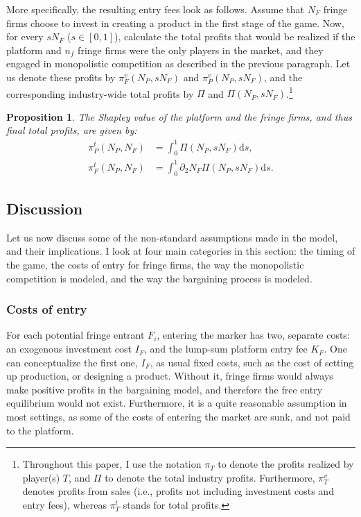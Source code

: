 \documentclass[a4paper]{article}
\newtheorem{proposition}{Proposition}
\newcommand{\ds}{\mathrm{d}s}
\begin{document}
More specifically, the resulting entry fees look as follows.
Assume that $N_F$ fringe firms choose to invest in creating a product in the first stage of the game.
Now, for every $s N_F$ ($s \in [0, 1]$), calculate the total profits that would be realized if the platform and $n_f$ fringe firms were the only players in the market, and they engaged in monopolistic competition as described in the previous paragraph.
Let us denote these profits by $\pi^v_{F}(N_P,s N_F)$ and $\pi^v_{P}(N_P,s N_F)$, and the corresponding industry-wide total profits by $\Pi$ and $\Pi(N_P,s N_F)$.\footnote{
    Throughout this paper, I use the notation $\pi_T$ to denote the profits realized by player(s) $T$, and $\Pi$ to denote the total industry profits.
    Furthermore, $\pi^v_T$ denotes profits from sales (i.e., profits not including investment costs and entry fees), whereas $\pi^t_T$ stands for total profits.
}

\begin{proposition}
    \label{prop:shapley_value}
    The Shapley value of the platform and the fringe firms, and thus final total profits, are given by:
    \begin{align*}
        \pi^t_P(N_P, N_F) &= \int_0^1 \Pi(N_P,s N_F) \ds, \\
        \pi^t_F(N_P, N_F) &= \int_0^1 \partial_2 N_F \Pi(N_P,s N_F) \ds.
    \end{align*}
\end{proposition}

\subsection{Discussion}
\label{sec:model_discussion}

Let us now discuss some of the non-standard assumptions made in the model, and their implications.
I look at four main categories in this section: the timing of the game, the costs of entry for fringe firms, the way the monopolistic competition is modeled, and the way the bargaining process is modeled.

\subsubsection{Costs of entry}

For each potential fringe entrant $F_i$, entering the marker has two, separate costs: an exogenous investment cost $I_F$, and the lump-sum platform entry fee $K_F$.
One can conceptualize the first one, $I_F$, as usual fixed costs, such as the cost of setting up production, or designing a product.
Without it, fringe firms would always make positive profits in the bargaining model, and therefore the free entry equilibrium would not exist.
Furthermore, it is a quite reasonable assumption in most settings, as some of the costs of entering the market are sunk, and not paid to the platform.
\end{document}
